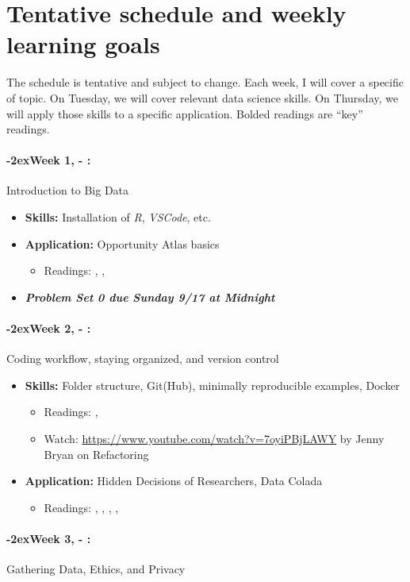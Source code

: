 \documentclass[11pt]{article}
\newcommand{\week}[1]{%
  \paragraph*{\kern-2ex\quad #1, \AdvanceDate[1]\syldate{\today} - \AdvanceDate[2]\syldate{\today}:}%
  \ifdim\wd1=\wd\MONDAY
    \AdvanceDate[7]
  \else
    \AdvanceDate[7]
  \fi%
}
\begin{document}

\newpage
\section*{Tentative schedule and weekly learning goals}
\label{sec:sched}
The schedule is tentative and subject to change. Each week, I will cover a specific of topic. On Tuesday, we will cover relevant data science skills. On Thursday, we will apply those skills to a specific application. Bolded readings are ``key'' readings.

\normalsize

\SetDate[28/08/2023]
\week{Week 1} Introduction to Big Data
\begin{itemize}
  \item \textbf{Skills:} Installation of \textit{R}, \textit{VSCode}, etc.
  \item \textbf{Application:} Opportunity Atlas basics
  \begin{itemize}
    \item Readings: \textbf{\cite{chetty2018opportunityatlas}}, \cite{chetty2020opportunity}, \cite{einav2014ageofbigdata}
  \end{itemize}
  \item \textit{\textbf{Problem Set 0 due Sunday 9/17 at Midnight}}
\end{itemize}
\week{Week 2} Coding workflow, staying organized, and version control
\begin{itemize}
  \item \textbf{Skills:} Folder structure, Git(Hub), minimally reproducible examples, Docker
  \begin{itemize}
    \item Readings: \textbf{\cite{gentzkowshapiro2014code}}, \cite{mcdermott2022docker}
    \item Watch: \url{https://www.youtube.com/watch?v=7oyiPBjLAWY} by Jenny Bryan on Refactoring
  \end{itemize}
  \item \textbf{Application:} Hidden Decisions of Researchers, Data Colada
  \begin{itemize}
    \item Readings: \textbf{\cite{huntingtonklen2021influence}}, \cite{tinyverse}, \cite{wickhamtidy}, \cite{datacolada2021groundhog}, \cite{datacolada2022groundhog}
  \end{itemize}
\end{itemize}
\week{Week 3} Gathering Data, Ethics, and Privacy
\end{document}
